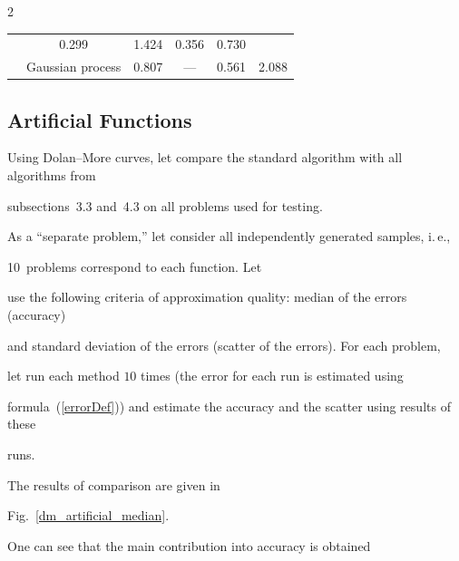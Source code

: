 \begin{multicols}{2}
\begin{table}[b]
\begin{center}
\begin{tabular}{cccccc}
                &0.299      &1.424& 0.356& 0.730  \\ 


      &Gaussian process   

                &0.807      &---      &0.561 & 2.088  \\ 

                \hline

    \end{tabular}

  \end{center}

\end{table}



\subsection{Artificial Functions}



\noindent

Using Dolan--More curves, let compare the standard algorithm with all algorithms from 

subsections~3.3 and~4.3 on all problems used for testing.

As a ``separate problem,'' let consider all independently generated samples, i.\,e., 

10~problems correspond to each function. Let 

use the following criteria of approximation quality: median of the errors (accuracy) 

and standard deviation of the errors (scatter of the errors). For each problem,

 let run each method $10$ times (the error for each run is estimated using 

 formula~(\ref{errorDef})) and estimate the accuracy and the scatter using results of these 

 runs.

 { %

 

 }







The results of comparison are given in 

Fig.~\ref{dm_artificial_median}.

One can see that the main contribution into accuracy is obtained 


\end{multicols}
